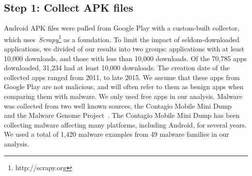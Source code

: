 \documentclass{llncs}
\begin{document}



\label{sec: collection}
\subsection{Step 1: Collect APK files}

Android APK files were pulled from Google Play with a custom-built collector, which uses~\emph{Scrapy}\footnote{http://scrapy.org} as a foundation. To limit the impact of seldom-downloaded applications, we divided of our results into two groups: applications with at least 10,000 downloads, and those with less than 10,000 downloads. Of the 70,785 apps downloaded, 31,234 had at least 10,000 downloads. The creation date of the collected apps ranged from 2011, to late 2015. We assume that these apps from Google Play are not malicious, and will often refer to them as benign apps when comparing them with malware. We only used free apps in our analysis. Malware was collected  from two well known sources, the Contagio Mobile Mini Dump~\cite{contagio_url} and the Malware Genome Project~\cite{Zhou:2012:DAM:2310656.2310710}. The Contagio Mobile Mini Dump has been collecting malware affecting many platforms, including Android, for several years. We used a total of 1,420 malware examples from 49 malware families in our analysis.
\end{document}
